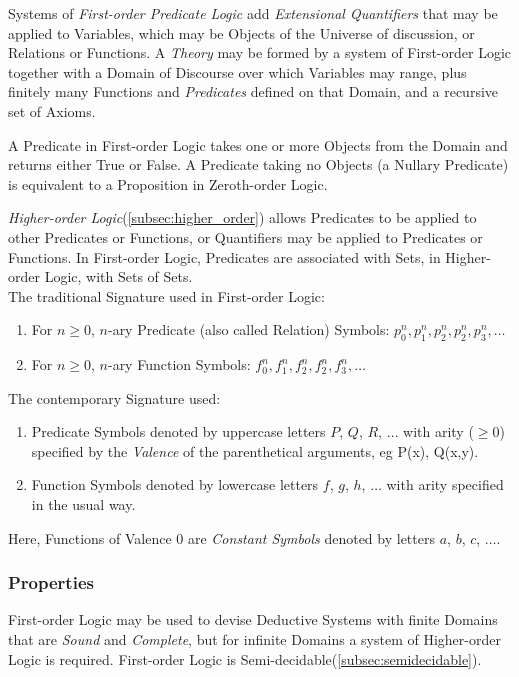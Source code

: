 \documentclass{article}
\begin{document}
Systems of \emph{First-order Predicate Logic} add \emph{Extensional
  Quantifiers} that may be applied to Variables, which may be Objects
of the Universe of discussion, or Relations or Functions. A
\emph{Theory} may be formed by a system of First-order Logic together
with a Domain of Discourse over which Variables may range, plus
finitely many Functions and \emph{Predicates} defined on that Domain,
and a recursive set of Axioms.

A Predicate in First-order Logic takes one or more Objects from the
Domain and returns either True or False. A Predicate taking no Objects
(a Nullary Predicate) is equivalent to a Proposition in Zeroth-order
Logic.

\emph{Higher-order Logic}(\ref{subsec:higher_order}) allows Predicates
to be applied to other Predicates or Functions, or Quantifiers may be
applied to Predicates or Functions. In First-order Logic, Predicates
are associated with Sets, in Higher-order Logic, with Sets of
Sets.
\\
The traditional Signature used in First-order Logic:
\begin{enumerate}
\item For $n \geq 0$, $n$-ary Predicate (also called Relation)
  Symbols: $p^{n}_0, p^{n}_1, p^{n}_2, p^{n}_2, p^{n}_3, \ldots$
\item For $n \geq 0$, $n$-ary Function Symbols: $f^{n}_0, f^{n}_1,
  f^{n}_2, f^{n}_2, f^{n}_3, \ldots$
\end{enumerate}
The contemporary Signature used:
\begin{enumerate}
\item Predicate Symbols denoted by uppercase letters $P$, $Q$, $R$,
  $\ldots$ with arity ($\geq 0$) specified by the \emph{Valence} of the
  parenthetical arguments, eg P(x), Q(x,y).
\item Function Symbols denoted by lowercase letters $f$, $g$, $h$,
  $\ldots$ with arity specified in the usual way.
\end{enumerate}
Here, Functions of Valence 0 are \emph{Constant Symbols} denoted by
letters $a$, $b$, $c$, $\ldots$.

\subsubsection{Properties}

First-order Logic may be used to devise Deductive Systems with
finite Domains that are \emph{Sound} and \emph{Complete}, but for
infinite Domains a system of Higher-order Logic is
required. First-order Logic is Semi-decidable(\ref{subsec:semidecidable}).
\end{document}
